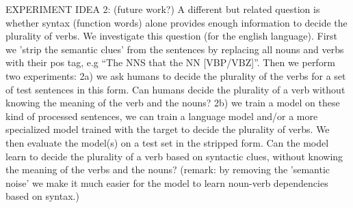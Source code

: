 EXPERIMENT IDEA 2:
(future work?) A different but related question is whether
syntax (function words) alone provides enough information 
to decide the plurality of verbs.
We investigate this question (for the english language). 
First we 'strip the semantic clues' from the sentences by replacing all nouns and verbs with their pos tag, e.g ``The NNS that the NN [VBP/VBZ]''. Then we perform two experiments: 
2a) we ask humans to decide the plurality of the verbs for a set of test sentences
in this form. Can humans decide the plurality of a verb without knowing the meaning of the verb and the nouns?
2b) we train a model on these kind of processed sentences,
we can train a language model and/or a more specialized model trained with the target
to decide the plurality of verbs.
We then evaluate the model(s) on a test set in the stripped form. 
Can the model learn to decide the plurality of a verb based on syntactic clues, without knowing the meaning of
the verbs and the nouns?
(remark: by removing the 'semantic noise' we make it much easier for the model to learn noun-verb dependencies based on syntax.)
